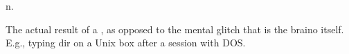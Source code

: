  n.

The actual result of a , as opposed to the mental glitch that
is the braino itself. E.g., typing dir on a Unix box after a session with DOS.

